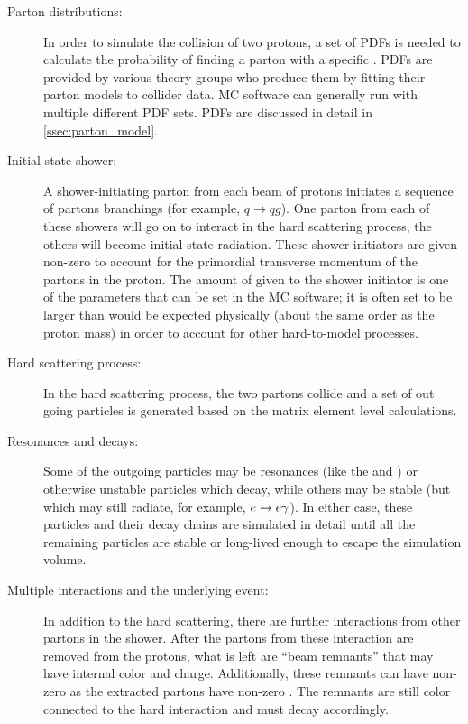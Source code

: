 \begin{description}

    \item[Parton distributions:] In order to simulate the collision of two
        protons, a set of PDFs is needed to calculate the probability of
        finding a parton with a specific . PDFs are provided by
        various theory groups who produce them by fitting their parton models
        to collider data. MC software can generally run with multiple different
        PDF sets. PDFs are discussed in detail in \cref{ssec:parton_model}.

    \item[Initial state shower:] A shower-initiating parton from each beam of
        protons initiates a sequence of partons branchings (for example, $q \to
        qg$). One parton from each of these showers will go on to interact in
        the hard scattering process, the others will become initial state
        radiation. These shower initiators are given non-zero \pt to account
        for the primordial transverse momentum of the partons in the proton.
        The amount of \pt given to the shower initiator is one of the
        parameters that can be set in the MC software; it is often set to be
        larger than would be expected physically (about the same order as the
        proton mass) in order to account for other hard-to-model processes.

    \item[Hard scattering process:] In the hard scattering process, the two
        partons collide and a set of out going particles is generated based on
        the matrix element level calculations.

    \item[Resonances and decays:] Some of the outgoing particles may be
        resonances (like the \W and \Z) or otherwise unstable particles which
        decay, while others may be stable (but which may still radiate, for
        example, $e \to e \gamma$). In either case, these particles and their
        decay chains are simulated in detail until all the remaining particles
        are stable or long-lived enough to escape the simulation volume.

    \item[Multiple interactions and the underlying event:] In addition to the
        hard scattering, there are further interactions from other partons in
        the shower. After the partons from these interaction are removed from
        the protons, what is left are ``beam remnants'' that may have internal
        color and charge. Additionally, these remnants can have non-zero \pt as
        the extracted partons have non-zero \pt. The remnants are still color
        connected to the hard interaction and must decay accordingly.


\end{description}
